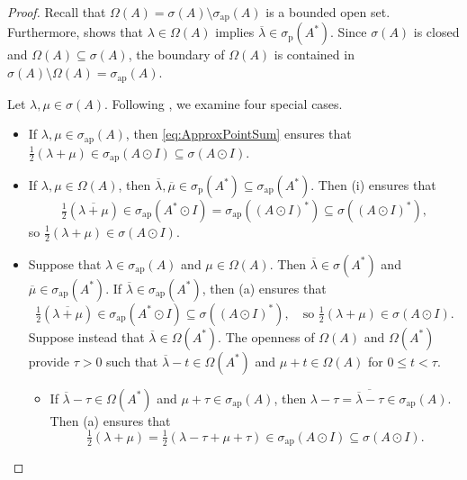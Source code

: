 \documentclass[10pt,reqno]{amsart}
\newcommand{\0}{{\color{lightgray}0}}
\renewcommand{\leq}{\leqslant}
\theoremstyle{definition}
\numberwithin{equation}{section}
\begin{document}
\begin{proof}
Recall that $\Omega(A)=\sigma(A)\setminus \sigma_{\textrm{ap}}(A)$ is a bounded open set.
Furthermore, \cite[Page 164]{Brown&Pearcy} shows that $\lambda \in \Omega(A)$ implies $\overline{\lambda}\in \sigma_{\mathrm{p}}(A^*)$. Since $\sigma(A)$ is closed and $\Omega(A) \subseteq \sigma(A)$, the boundary of $\Omega(A)$ is contained in $ \sigma(A) \setminus \Omega(A) = \sigma_{\textrm{ap}}(A)$. 


Let $\lambda,\mu \in \sigma(A)$. Following \cite[Proof 2]{Brown&Pearcy}, we examine four special cases.
\begin{itemize}
    \item[(i)] If $\lambda,\mu \in \sigma_{\textrm{ap}}(A)$, then \eqref{eq:ApproxPointSum} ensures that 
    	$\frac{1}{2} (\lambda+\mu) \in \sigma_{\textrm{ap}}(A\odot I)\subseteq \sigma(A\odot I)$.

    \item[(ii)] If $\lambda,\mu \in \Omega(A)$, then    
    $\overline{\lambda},\overline{\mu} \in \sigma_{\textrm{p}}(A^*)\subseteq \sigma_{\textrm{ap}}(A^*)$. Then (i) ensures that 
    \begin{equation*}
        \tfrac{1}{2}(\overline{\lambda+\mu})\in \sigma_{\textrm{ap}}(A^* \odot I)
        =\sigma_{\textrm{ap}}((A\odot I)^*)\subseteq \sigma ((A\odot I)^*),
    \end{equation*}
    so $\frac{1}{2} (\lambda+\mu) \in \sigma(A\odot I)$.

    \item[(iii)] Suppose that $\lambda \in \sigma_{\textrm{ap}}(A)$ and $\mu\in \Omega(A)$.
    	Then $\overline{\lambda} \in \sigma(A^*)$ and $\overline{\mu}\in \sigma_{\textrm{ap}}(A^*)$. 
	If $\overline{\lambda}\in \sigma_{\textrm{ap}}(A^*)$, then (a) ensures that
	\begin{equation*}
            \tfrac{1}{2}(\overline{\lambda+\mu})\in \sigma_{\textrm{ap}}(A^*\odot I)\subseteq \sigma((A\odot I)^*),
            \quad \text{so $\tfrac{1}{2}(\lambda+\mu) \in \sigma(A\odot I)$}.
	\end{equation*}
	Suppose instead that $\overline{\lambda} \in \Omega(A^*)$.
	The openness of $\Omega(A)$ and $\Omega(A^*)$
            provide $\tau >0$ such that $\overline{\lambda}-t \in \Omega(A^*)$ and $\mu+t \in \Omega(A)$ for $0\leq t <\tau $.
            \begin{itemize}
                \item If $\overline{\lambda}-\tau \in \Omega(A^*)$ and $\mu+\tau  \in \sigma_{\textrm{ap}}(A)$,
                then $\lambda-\tau =\overline{\overline{\lambda}-\tau }\in \sigma_{\textrm{ap}}(A)$.
                Then (a) ensures that
                \begin{equation*}
                    \tfrac{1}{2}(\lambda+\mu) = \tfrac{1}{2}(\lambda-\tau +\mu+\tau  )\in \sigma_{\textrm{ap}}(A\odot I)\subseteq \sigma (A\odot I). 
                \end{equation*}


\end{itemize}
\end{itemize}
\end{proof}
\end{document}
